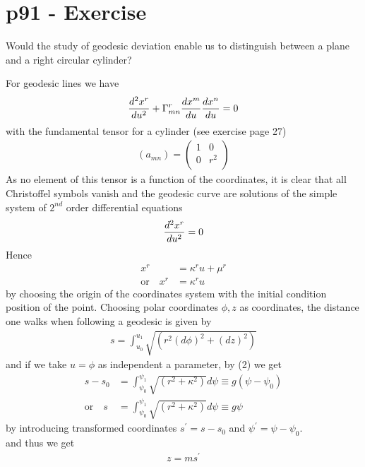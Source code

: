 \section{p91 - Exercise}
\begin{tcolorbox}
Would the study of geodesic deviation enable us to distinguish between a plane and a right circular cylinder?
\end{tcolorbox}
For geodesic lines we have
\begin{align*}
\dv[2]{x^r}{u} + \Gamma^r_{mn}\dv{x^m}{u}\dv{x^n}{u} = 0\\
\end{align*}
with the fundamental tensor for a cylinder (see exercise page 27)
\begin{align*} 
(a_{mn}) = \begin{pmatrix}
 1& 0 \\
0 & r^2 \\
\end{pmatrix}
\end{align*}
As no element of this tensor is a function of the coordinates, it is clear that all Christoffel symbols vanish and the geodesic curve are solutions of the simple system of $2^{nd}$ order differential equations
\begin{align*}
\dv[2]{x^r}{u}  = 0
\end{align*}
Hence
\begin{align}
x^r  &= \kappa^r u + \mu^r\\
\text{or}\quad x^r &= \kappa^r u
\end{align}
by choosing the origin of the coordinates system with the initial condition position of the point.
Choosing polar coordinates $\phi, z$ as coordinates, the distance one walks when following a geodesic is given by
\begin{align*}
 s= \int_{u_0}^{u_1}\sqrt{(r^2(d\phi)^2 + (dz)^2)}
\end{align*}
and if we take $u=\phi$ as independent a parameter, by (2) we get 
\begin{align*}
 s-s_0 &= \int_{\psi_0}^{\psi_1}\sqrt{(r^2 + \kappa^2)}d\psi \equiv g(\psi - \psi_0)\\
 \text{or}\quad s&= \int_{\psi_0}^{\psi_1}\sqrt{(r^2 + \kappa^2)}d\psi \equiv g\psi
\end{align*}
by introducing transformed coordinates $s^{'}= s-s_0$ and $\psi^{'} =\psi - \psi_0$.\\
and thus we get 
\begin{align}
 z = m s^{'}
\end{align}
